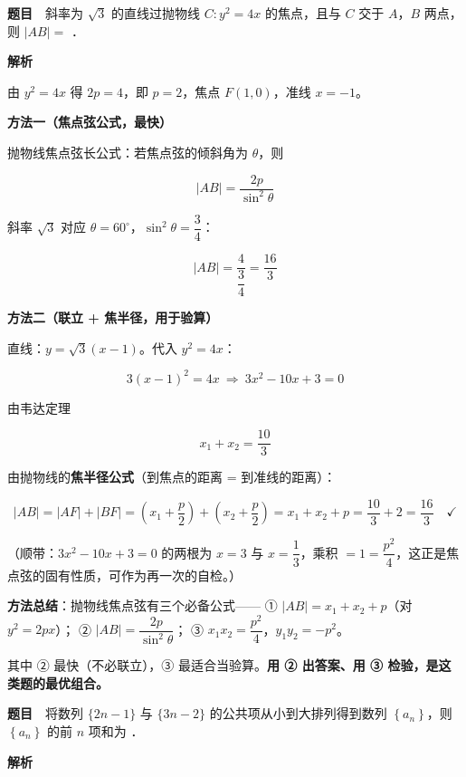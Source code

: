 \par\medskip


\textbf{题目}　斜率为 $\sqrt3$ 的直线过抛物线 $C:y^{2}=4x$ 的焦点，且与 $C$ 交于 $A$，$B$ 两点，则 $|AB|=$ \gkblank{}．

\textbf{解析}

由 $y^{2}=4x$ 得 $2p=4$，即 $p=2$，焦点 $F(1,0)$，准线 $x=-1$。

\textbf{方法一（焦点弦公式，最快）}

抛物线焦点弦长公式：若焦点弦的倾斜角为 $\theta$，则

\[|AB|=\frac{2p}{\sin^{2}\theta}\]

斜率 $\sqrt3$ 对应 $\theta=60^\circ$，$\sin^{2}\theta=\dfrac34$：

\[|AB|=\frac{4}{\dfrac34}=\frac{16}3\]

\textbf{方法二（联立 + 焦半径，用于验算）}

直线：$y=\sqrt3(x-1)$。代入 $y^{2}=4x$：

\[3(x-1)^{2}=4x\ \Longrightarrow\ 3x^{2}-10x+3=0\]

由韦达定理

\[x_1+x_2=\frac{10}3\]

由抛物线的\textbf{焦半径公式}（到焦点的距离 = 到准线的距离）：

\[|AB|=|AF|+|BF|=\left(x_1+\frac p2\right)+\left(x_2+\frac p2\right)=x_1+x_2+p=\frac{10}3+2=\frac{16}3\quad\checkmark\]

（顺带：$3x^{2}-10x+3=0$ 的两根为 $x=3$ 与 $x=\dfrac13$，乘积 $=1=\dfrac{p^{2}}4$，这正是焦点弦的固有性质，可作为再一次的自检。）


\begin{gktip}
\textbf{方法总结}：抛物线焦点弦有三个必备公式——
① $|AB|=x_1+x_2+p$（对 $y^{2}=2px$）；
② $|AB|=\dfrac{2p}{\sin^{2}\theta}$；
③ $x_1x_2=\dfrac{p^{2}}4$，$y_1y_2=-p^{2}$。

其中 ② 最快（不必联立），③ 最适合当验算。\textbf{用 ② 出答案、用 ③ 检验，是这类题的最优组合。}
\end{gktip}

\par\medskip


\textbf{题目}　将数列 $\{2n-1\}$ 与 $\{3n-2\}$ 的公共项从小到大排列得到数列 $\left\{a_n\right\}$，则 $\left\{a_n\right\}$ 的前 $n$ 项和为 \gkblank{}．

\textbf{解析}


